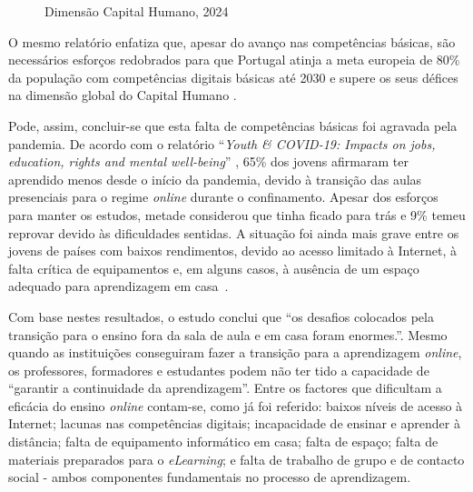 \begin{figure}[hbtp]
	\centering%
		\centering
		\qquad
		\caption{Dimensão Capital Humano, 2024 \cite{itu2024facts}}%
		\label{fig:capitalhumano}%
	\end{figure}

O mesmo relatório enfatiza que, apesar do avanço nas competências básicas, são necessários esforços redobrados para que Portugal atinja a meta europeia de 80\% da população com competências digitais básicas até 2030 e supere os seus défices na dimensão global do Capital Humano \cite{DESI2024}.

Pode, assim, concluir-se que esta falta de competências básicas foi agravada pela pandemia. De acordo com o relatório ``\textit{Youth \& COVID-19: Impacts on jobs, education, rights and mental well-being}'' \cite{impactocovideducacao}, 65\% dos jovens afirmaram ter aprendido menos desde o início da pandemia, devido à transição das aulas presenciais para o regime \textit{online} durante o confinamento. Apesar dos esforços para manter os estudos, metade considerou que tinha ficado para trás e 9\% temeu reprovar devido às dificuldades sentidas. A situação foi ainda mais grave entre os jovens de países com baixos rendimentos, devido ao acesso limitado à Internet, à falta crítica de equipamentos e, em alguns casos, à ausência de um espaço adequado para aprendizagem em casa~\cite{impactocovideducacao}.

Com base nestes resultados, o estudo conclui que ``os desafios colocados pela transição para o ensino fora da sala de aula e em casa foram enormes.''. Mesmo quando as instituições conseguiram fazer a transição para a aprendizagem \textit{online}, os professores, formadores e estudantes podem não ter tido a capacidade de ``garantir a continuidade da aprendizagem''. Entre os factores que dificultam a eficácia do ensino \textit{online} contam-se, como já foi referido: baixos níveis de acesso à Internet; lacunas nas competências digitais; incapacidade de ensinar e aprender à distância; falta de equipamento informático em casa; falta de espaço; falta de materiais preparados para o \textit{eLearning}; e falta de trabalho de grupo e de contacto social - ambos componentes fundamentais no processo de aprendizagem.


